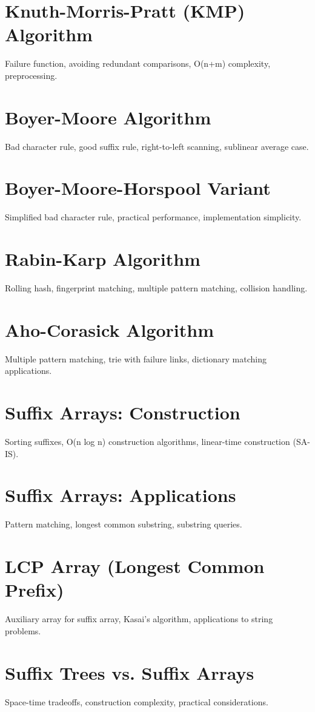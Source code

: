 \chapter{Knuth-Morris-Pratt (KMP) Algorithm}
Failure function, avoiding redundant comparisons, O(n+m) complexity, preprocessing.

\chapter{Boyer-Moore Algorithm}
Bad character rule, good suffix rule, right-to-left scanning, sublinear average case.

\chapter{Boyer-Moore-Horspool Variant}
Simplified bad character rule, practical performance, implementation simplicity.

\chapter{Rabin-Karp Algorithm}
Rolling hash, fingerprint matching, multiple pattern matching, collision handling.

\chapter{Aho-Corasick Algorithm}
Multiple pattern matching, trie with failure links, dictionary matching applications.

\chapter{Suffix Arrays: Construction}
Sorting suffixes, O(n log n) construction algorithms, linear-time construction (SA-IS).

\chapter{Suffix Arrays: Applications}
Pattern matching, longest common substring, substring queries.

\chapter{LCP Array (Longest Common Prefix)}
Auxiliary array for suffix array, Kasai's algorithm, applications to string problems.

\chapter{Suffix Trees vs. Suffix Arrays}
Space-time tradeoffs, construction complexity, practical considerations.

